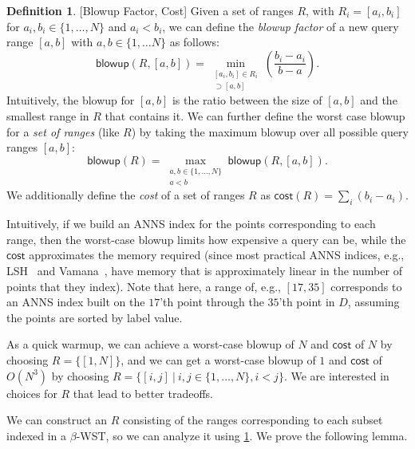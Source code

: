 \documentclass{article}
\theoremstyle{plain}
\theoremstyle{definition}
\newtheorem{definition}[theorem]{Definition}
\theoremstyle{remark}
\newcommand{\shangdi}[1]{{\color{blue}{\bf Shangdi:} #1}}
\newcommand{\julian}[1]{{\color{red}{\bf Julian:} #1}}
\newcommand{\josh}[1]{{\color{orange}{\bf Josh:} #1}}
\begin{document}
\begin{definition}
\label{def:blowup-factor}[Blowup Factor, Cost]
    Given a set of ranges $R$, with $R_i = [a_i, b_i]$ for $a_i, b_i \in \{1, \ldots, N\}$ and $a_i < b_i$, we can define the \textit{blowup factor} of a new query range $[a, b]$ with $a, b \in \{1, \ldots N\}$ as follows:
    $$\mathsf{blowup}(R, [a, b]) = \min_{\substack{[a_i, b_i] \in R_i \\ [a_i, b_i] \supset [a, b] }} \left(\frac{b_i - a_i}{b - a}\right).$$
    Intuitively, the blowup for $[a, b]$ is the ratio between the size of $[a, b]$ and the smallest range in $R$ that contains it. 
    We can further define the worst case blowup for a \textit{set of ranges} (like $R$) by taking the maximum blowup over all possible query ranges $[a, b]$: 
    $$\mathsf{blowup}(R) = \max_{\substack{a, b \in \{1,\ldots,N\}   \\ a < b }} \mathsf{blowup}(R, [a, b]).$$
    We additionally define the \textit{cost} of a set of ranges $R$ as 
    $\mathsf{cost}(R) = \sum_i (b_i - a_i)$. 
\end{definition}

Intuitively, if we build an ANNS index for the points corresponding to each range, then the worst-case blowup limits how expensive a query can be, while the $\mathsf{cost}$ approximates the memory required (since most practical ANNS indices, e.g., LSH~\cite{andoni2008near} and Vamana~\cite{diskann}, have memory that is approximately linear in the number of points that they index). Note that here, a range of, e.g., $[17, 35]$ corresponds to an ANNS index built on the $17$'th point through the $35$'th point in $D$, assuming the points are sorted by label value.

As a quick warmup, we can achieve a worst-case blowup of $N$ and $\mathsf{cost}$ of $N$ by choosing $R = \{[1, N]\}$, and we can get a worst-case blowup of $1$ and $\mathsf{cost}$ of $O(N^3)$ by choosing $R = \{[i, j] \ |\ i, j \in \{1,\ldots,N\}, i < j\}$. We are interested in choices for $R$ that lead to better tradeoffs. 

We can construct an $R$ consisting of the ranges corresponding to each subset indexed in a $\beta$-WST, so we can analyze it using \cref{def:blowup-factor}. We prove the following lemma.
\end{document}
